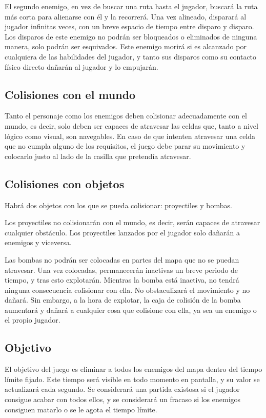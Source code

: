 		El segundo enemigo, en vez de buscar una ruta hasta el jugador, buscará la ruta más corta para alienarse con él y la recorrerá. Una vez alineado, disparará al jugador infinitas veces, con un breve espacio de tiempo entre disparo y disparo. Los disparos de este enemigo no podrán ser bloqueados o eliminados de ninguna manera, solo podrán ser esquivados. Este enemigo morirá si es alcanzado por cualquiera de las habilidades del jugador, y tanto sus disparos como su contacto físico directo dañarán al jugador y lo empujarán.

	\subsection{Colisiones con el mundo}

		Tanto el personaje como los enemigos deben colisionar adecuadamente con el mundo, es decir, solo deben ser capaces de atravesar las celdas que, tanto a nivel lógico como visual, son navegables. En caso de que intenten atravesar una celda que no cumpla alguno de los requisitos, el juego debe parar su movimiento y colocarlo justo al lado de la casilla que pretendía atravesar.

	\subsection{Colisiones con objetos}

		Habrá dos objetos con los que se pueda colisionar: proyectiles y bombas.

		Los proyectiles no colisionarán con el mundo, es decir, serán capaces de atravesar cualquier obstáculo. Los proyectiles lanzados por el jugador solo dañarán a enemigos y viceversa.

		Las bombas no podrán ser colocadas en partes del mapa que no se puedan atravesar. Una vez colocadas, permanecerán inactivas un breve periodo de tiempo, y tras esto explotarán. Mientras la bomba está inactiva, no tendrá ninguna consecuencia colisionar con ella. No obstaculizará el movimiento y no dañará. Sin embargo, a la hora de explotar, la caja de colisión de la bomba aumentará y dañará a cualquier cosa que colisione con ella, ya sea un enemigo o el propio jugador.

	\subsection{Objetivo}

		El objetivo del juego es eliminar a todos los enemigos del mapa dentro del tiempo límite fijado. Este tiempo será visible en todo momento en pantalla, y su valor se actualizará cada segundo. Se considerará una partida existosa si el jugador consigue acabar con todos ellos, y se considerará un fracaso si los enemigos consiguen matarlo o se le agota el tiempo límite.


